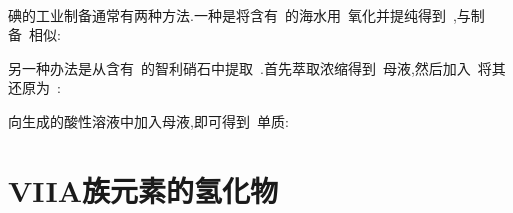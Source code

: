 \documentclass{ctexbook}
\begin{document}
\paragraph{}
碘的工业制备通常有两种方法.一种是将含有~的海水用~氧化并提纯得到~,与制备~相似:
\begin{tightcenter}
\end{tightcenter}
另一种办法是从含有~的智利硝石中提取~.首先萃取浓缩得到~母液,然后加入~将其还原为~:
\begin{tightcenter}
\end{tightcenter}
向生成的酸性溶液中加入母液,即可得到~单质:
\begin{tightcenter}
\end{tightcenter}
\section{VIIA族元素的氢化物}
\end{document}

